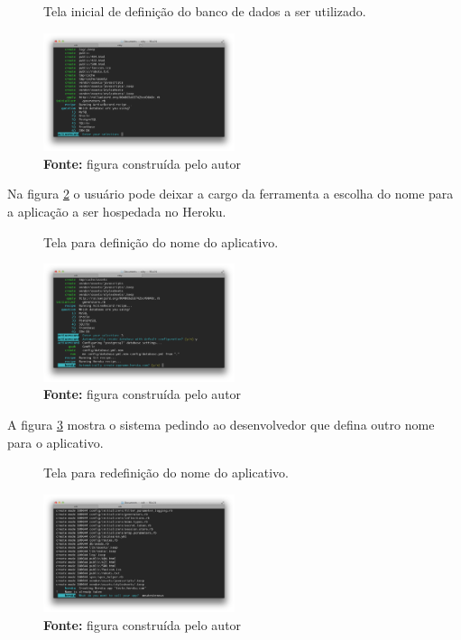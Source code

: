 \begin{figure}[h]
  \centering
  \caption{Tela inicial de defini\c{c}\~ao do banco de dados a ser utilizado.}
  \includegraphics[width=0.5\textwidth]{./fig/setup2}
  \caption*{\textbf{Fonte:} figura constru\'ida pelo autor}
  \label{fig:fig7}
\end{figure}

Na figura \ref{fig:fig8} o usu\'ario pode deixar a cargo da ferramenta a escolha do nome para a aplica\c{c}\~ao a ser hospedada no Heroku.

\begin{figure}[h]
  \centering
  \caption{Tela para defini\c{c}\~ao do nome do aplicativo.}
  \includegraphics[width=0.5\textwidth]{./fig/setup3}
  \caption*{\textbf{Fonte:} figura constru\'ida pelo autor}
  \label{fig:fig8}
\end{figure}

\pagebreak

A figura \ref{fig:fig9} mostra o sistema pedindo ao desenvolvedor que defina outro nome para o aplicativo.

\begin{figure}[h]
  \centering
  \caption{Tela para redefini\c{c}\~ao do nome do aplicativo.}
  \includegraphics[width=0.5\textwidth]{./fig/setup4}
  \caption*{\textbf{Fonte:} figura constru\'ida pelo autor}
  \label{fig:fig9}
\end{figure}

